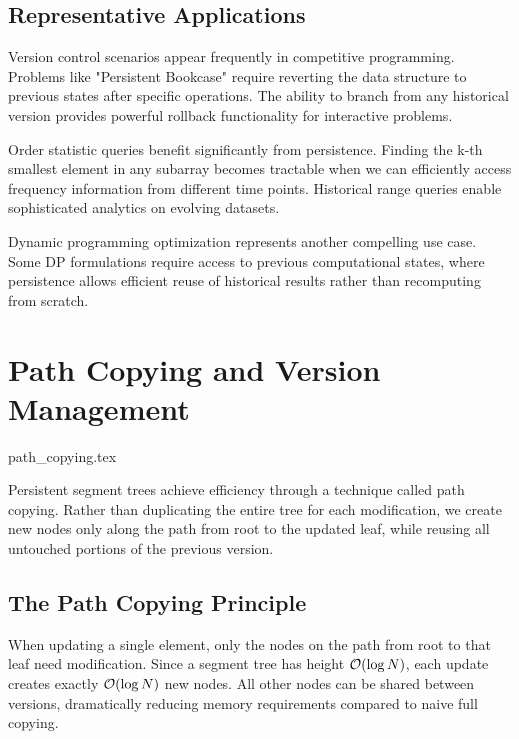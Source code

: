 \subsection{Representative Applications}

Version control scenarios appear frequently in competitive programming. Problems like "Persistent Bookcase" require reverting the data structure to previous states after specific operations. The ability to branch from any historical version provides powerful rollback functionality for interactive problems.

Order statistic queries benefit significantly from persistence. Finding the k-th smallest element in any subarray becomes tractable when we can efficiently access frequency information from different time points. Historical range queries enable sophisticated analytics on evolving datasets.

Dynamic programming optimization represents another compelling use case. Some DP formulations require access to previous computational states, where persistence allows efficient reuse of historical results rather than recomputing from scratch.

\section{Path Copying and Version Management}
\label{sec:path_copying_roots}
\begin{marginfigure}
{path_copying.tex}
\caption{Path {\footnotesize 1$\to$2$\to$6$\to$5} copied as {\footnotesize 1'$\,{\to}\,$2'$\,{\to}\,$6'$\,{\to}\,$5'}. Nodes 3,4,7 shared.}
\end{marginfigure}


Persistent segment trees achieve efficiency through a technique called path copying. Rather than duplicating the entire tree for each modification, we create new nodes only along the path from root to the updated leaf, while reusing all untouched portions of the previous version.

\subsection{The Path Copying Principle}

When updating a single element, only the nodes on the path from root to that leaf need modification. Since a segment tree has height $\mathcal{O}(\log N)$, each update creates exactly $\mathcal{O}(\log N)$ new nodes. All other nodes can be shared between versions, dramatically reducing memory requirements compared to naive full copying.

